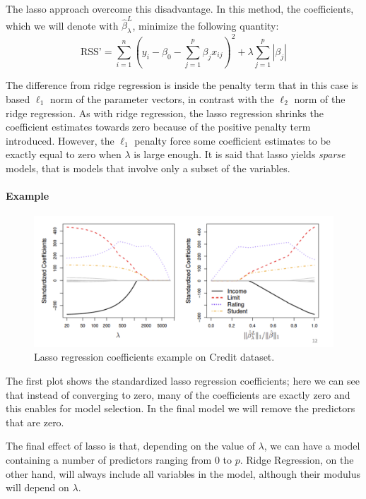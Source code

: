 The lasso approach overcome this disadvantage. In this method, the coefficients, which we will denote with $\hat{\beta}_\lambda^L$, minimize the following quantity:
\[
    \text{RSS'} = \sum_{i=1}^{n} \left(y_i - \beta_0 - \sum_{j=1}^{p} \beta_j x_{ij}\right)^2 + \lambda \sum_{j=1}^{p} |\beta_j |
\]

The difference from ridge regression is inside the penalty term that in this case is based $\ell_1$ norm of the parameter vectors, in contrast with the $\ell_2$ norm of the ridge regression. 
As with ridge regression, the lasso regression shrinks the coefficient estimates towards zero because of the positive penalty term introduced. 
However, the $\ell_1$ penalty force some coefficient estimates to be exactly equal to zero when $\lambda$ is large enough. 
It is said that lasso yields \textit{sparse} models, that is models that involve only a subset of the variables.

\paragraph*{Example}
\begin{figure}
    \centering
    \includegraphics[width=0.8\linewidth]{./figures/chapter_4/lassoexample.png}
    \caption{Lasso regression coefficients example on Credit dataset.}
    \label{fig:lassoexample}
\end{figure}



The first plot shows the standardized lasso regression coefficients; here we can see that instead of converging to zero, many of the coefficients are exactly zero and this enables for model selection. 
In the final model we will remove the predictors that are zero.

The final effect of lasso is that, depending on the value of $\lambda$, we can have a model containing a number of predictors ranging from $0$ to $p$.
Ridge Regression, on the other hand, will always include all variables in the model, although their modulus will depend on $\lambda$.

